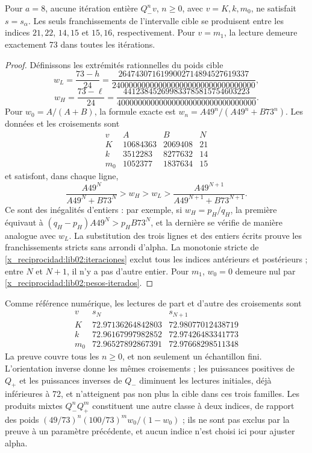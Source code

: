 \begin{proposition}
\label{x_reciprocidad:lib02:cruces-enteros}
Pour \(a=8\), aucune itération entière \(Q_-^nv\), \(n\geq0\),
avec \(v=K,k,m_0\), ne satisfait \(s=s_\alpha\). Les seuls franchissements
de l’intervalle cible se produisent entre les indices \(21,22\),
\(14,15\) et \(15,16\), respectivement. Pour \(v=m_1\), la
lecture demeure exactement 73 dans toutes les itérations.
\end{proposition}
\begin{proof}
Définissons les extrémités rationnelles du poids cible
\[
 w_L=\frac{73-h}{24}
 =\frac{2647430716199002714894527619337}
 {2400000000000000000000000000000000},
\]
\[
 w_H=\frac{73-\ell}{24}
 =\frac{441238452699833785815754603223}
 {400000000000000000000000000000000}.
\]
Pour \(w_0=A/(A+B)\), la formule exacte est
\(w_n=A49^n/(A49^n+B73^n)\). Les données et les croisements sont
\[
\begin{array}{c|r|r|c}
 v&A&B&N\\\hline
 K&10684363&2069408&21\\
 k&3512283&8277632&14\\
 m_0&1052377&1837634&15
\end{array}
\]
et satisfont, dans chaque ligne,
\[
 \frac{A49^N}{A49^N+B73^N}>w_H>w_L>
 \frac{A49^{N+1}}{A49^{N+1}+B73^{N+1}}.
\]
Ce sont des inégalités d’entiers : par exemple, si
\(w_H=p_H/q_H\), la première équivaut à
\((q_H-p_H)A49^N>p_HB73^N\), et la dernière se vérifie
de manière analogue avec \(w_L\). La substitution des trois lignes et des
entiers écrits prouve les franchissements stricts sans arrondi
d’alpha. La monotonie stricte de \cref{x_reciprocidad:lib02:iteraciones} exclut
tous les indices antérieurs et postérieurs ; entre \(N\) et
\(N+1\), il n’y a pas d’autre entier. Pour \(m_1\), \(w_0=0\) demeure
nul par \eqref{x_reciprocidad:lib02:pesos-iterados}.
\end{proof}

Comme référence numérique, les lectures de part et d’autre des croisements sont
\[
\begin{array}{c|c|c}
 v&s_N&s_{N+1}\\\hline
 K&72.97136264842803&72.98077012438719\\
 k&72.96167997982852&72.97426483341773\\
 m_0&72.96527892867391&72.97668298511348
\end{array}
\]
La preuve couvre tous les \(n\geq0\), et non seulement un échantillon fini.
L’orientation inverse donne les mêmes croisements ; les puissances positives de
\(Q_+\) et les puissances inverses de \(Q_-\) diminuent les
lectures initiales, déjà inférieures à 72, et n’atteignent pas non plus la cible
dans ces trois familles. Les produits mixtes \(Q_-^nQ_+^m\)
constituent une autre classe à deux indices, de rapport des poids
\((49/73)^n(100/73)^m w_0/(1-w_0)\) ; ils ne sont pas exclus par
la preuve à un paramètre précédente, et aucun indice n’est choisi ici pour ajuster
alpha.

